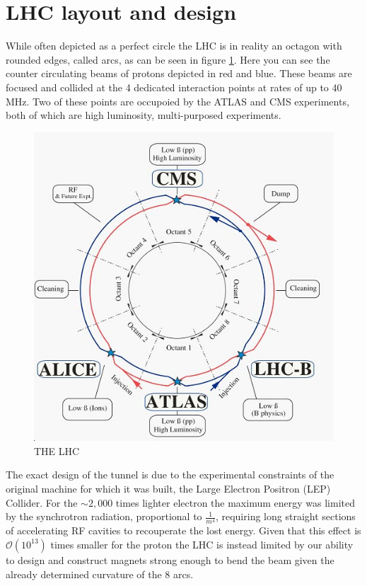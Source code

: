 \section{LHC layout and design} \label{sec:lhc:layout}

While often depicted as a perfect circle the LHC is in reality an octagon with
rounded edges, called arcs, as can be seen in figure \ref{fig:lhc_schematic}.
Here you can see the counter circulating beams of protons depicted in red and
blue.  These beams are focused and collided at the 4 dedicated interaction
points at rates of up to 40 MHz.  Two of these points are occupoied by the
ATLAS and CMS experiments, both of which are high luminosity, multi-purposed
experiments.

\begin{figure}[!htbp] 
  \begin{center}
    \includegraphics[width=0.9\linewidth]{figures/lhc/lhc_schematic.jpg}
    \caption{ THE LHC} 
    \label{fig:lhc_schematic} 
  \end{center} 
\end{figure}

The exact design of the tunnel is due to the experimental constraints of the
original machine for which it was built, the Large Electron Positron (LEP)
Collider.  For the $\sim 2,000$ times lighter electron the maximum energy was
limited by the synchrotron radiation, proportional to $\frac{1}{m^4}$, requiring
long straight sections of accelerating RF cavities to recouperate the lost
energy.  Given that this effect is $\mathcal{O}(10^{13})$ times smaller for the
proton the LHC is instead limited by our ability to design and construct magnets
strong enough to bend the beam given the already determined curvature of the 8
arcs.

